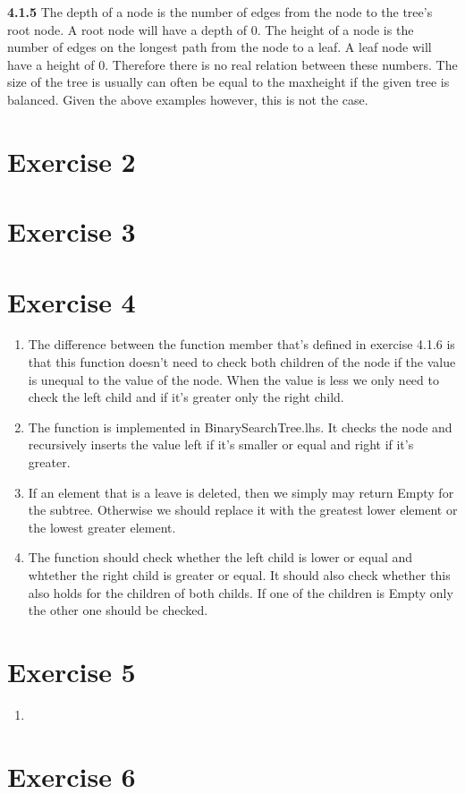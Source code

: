 \documentclass{article}
\begin{document}
\textbf{4.1.5}
The depth of a node is the number of edges from the node to the tree's root node.
A root node will have a depth of 0.
The height of a node is the number of edges on the longest path from the node to a leaf.
A leaf node will have a height of 0. Therefore there is no real relation between these numbers. The size of the tree is usually can often be equal to the maxheight if the given tree is balanced. Given the above examples however, this is not the case.
\section*{Exercise 2}


\section*{Exercise 3}


\section*{Exercise 4}
\begin{enumerate}
  \item The difference between the function member that's defined in exercise 4.1.6 is that this function doesn't need to check both children of the node if the value is unequal to the value of the node. When the value is less we only need to check the left child and if it's greater only the right child.
  \item The function is implemented in BinarySearchTree.lhs. It checks the node and recursively inserts the value left if it's smaller or equal and right if it's greater.
  \item If an element that is a leave is deleted, then we simply may return Empty for the subtree. Otherwise we should replace it with the greatest lower element or the lowest greater element.
  \item The function should check whether the left child is lower or equal and whtether the right child is greater or equal. It should also check whether this also holds for the children of both childs. If one of the children is Empty only the other one should be checked.
\end{enumerate}

\section*{Exercise 5}
\begin{enumerate}
  \item
\end{enumerate}

\section*{Exercise 6}
\end{document}
